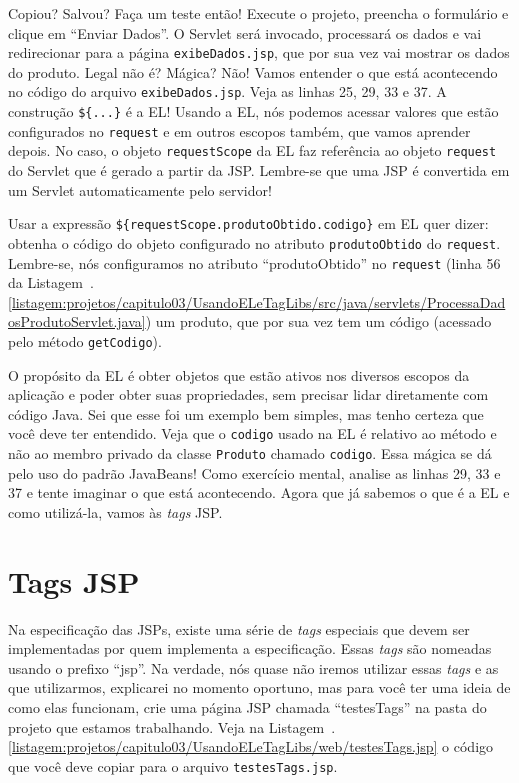 
Copiou? Salvou? Faça um teste então! Execute o projeto, preencha o formulário e clique em ``Enviar Dados''. O Servlet será invocado, processará os dados e vai redirecionar para a página \texttt{exibeDados.jsp}, que por sua vez vai mostrar os dados do produto. Legal não é? Mágica? Não! Vamos entender o que está acontecendo no código do arquivo \texttt{exibeDados.jsp}. Veja as linhas 25, 29, 33 e 37. A construção \texttt{\$\{...\}} é a EL! Usando a EL, nós podemos acessar valores que estão configurados no \texttt{request} e em outros escopos também, que vamos aprender depois. No caso, o objeto \texttt{requestScope} da EL faz referência ao objeto \texttt{request} do Servlet que é gerado a partir da JSP. Lembre-se que uma JSP é convertida em um Servlet automaticamente pelo servidor!

Usar a expressão \texttt{\$\{requestScope.produtoObtido.codigo\}} em EL quer dizer: obtenha o código do objeto configurado no atributo \texttt{produtoObtido} do \texttt{request}. Lembre-se, nós configuramos no atributo ``produtoObtido'' no \texttt{request} (linha 56 da Listagem~\thechapter.\ref{listagem:projetos/capitulo03/UsandoELeTagLibs/src/java/servlets/ProcessaDadosProdutoServlet.java}) um produto, que por sua vez tem um código (acessado pelo método \texttt{getCodigo}).

O propósito da EL é obter objetos que estão ativos nos diversos escopos da aplicação e poder obter suas propriedades, sem precisar lidar diretamente com código Java. Sei que esse foi um exemplo bem simples, mas tenho certeza que você deve ter entendido. Veja que o \texttt{codigo} usado na EL é relativo ao método  e não ao membro privado da classe \texttt{Produto} chamado \texttt{codigo}. Essa mágica se dá pelo uso do padrão JavaBeans! Como exercício mental, analise as linhas 29, 33 e 37 e tente imaginar o que está acontecendo. Agora que já sabemos o que é a EL e como utilizá-la, vamos às \textit{tags} JSP.


\section{Tags JSP}

Na especificação das JSPs, existe uma série de \textit{tags} especiais que devem ser implementadas por quem implementa a especificação. Essas \textit{tags} são nomeadas usando o prefixo ``jsp''. Na verdade, nós quase não iremos utilizar essas \textit{tags} e as que utilizarmos, explicarei no momento oportuno, mas para você ter uma ideia de como elas funcionam, crie uma página JSP chamada ``testesTags'' na pasta  do projeto que estamos trabalhando. Veja na Listagem~\thechapter.\ref{listagem:projetos/capitulo03/UsandoELeTagLibs/web/testesTags.jsp} o código que você deve copiar para o arquivo \texttt{testesTags.jsp}. 

